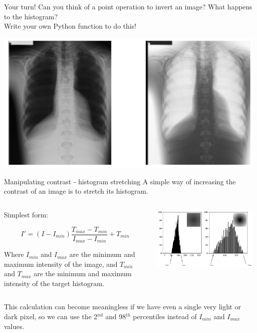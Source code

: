 \documentclass[9pt, aspectratio=169]{beamer}
\begin{document}
\begin{frame}
    {Your turn!}
    Can you think of a point operation to invert an image? What happens to the histogram?\\Write your own Python function to do this!

    \centering
    \includegraphics[width=.8\textwidth]{invert_image.png}

\end{frame}
\begin{frame}{Manipulating contrast - histogram stretching}
    A simple way of increasing the contrast of an image is to stretch its histogram.

    \begin{columns}
        \begin{column}{.4\textwidth}
            Simplest form:

            $$I' = (I - I_{min}) \frac{T_{max}-T_{min}}{I_{max}-I_{min}} + T_{min}$$

            Where $I_{min}$ and $I_{max}$ are the minimum and maximum intensity of the image, and $T_{min}$ and $T_{max}$ are the minimum and maximum intensity of the target histogram.
        \end{column}
        \begin{column}{.6\textwidth}
            \centering
            \includegraphics[width=\textwidth]{histo_stretching_example.png}
        \end{column}
    \end{columns}
    \pause
    This calculation can become meaningless if we have even a single very light or dark pixel, so we can use the 2$^{nd}$ and 98$^{th}$ percentiles instead of $I_{min}$ and $I_{max}$ values.
\end{frame}
\end{document}
